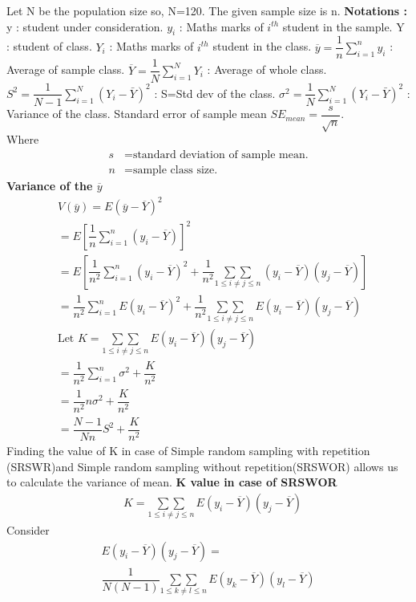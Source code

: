 Let N be the population size so, N=120. The given sample size is n.
\textbf{Notations :}
y : student under consideration.
$y_i$ : Maths marks of $i^{th}$ student in the sample.
Y : student of class.
$Y_i$ : Maths marks of $i^{th}$ student in the class.
$\overline{y}=\dfrac{1}{n}\sum_{i=1}^{n}y_i$ : Average of sample class.
$\overline{Y}=\dfrac{1}{N}\sum_{i=1}^{N}Y_i$ : Average of whole class.
$S^2 = \dfrac{1}{N-1} \sum_{i=1}^{N} (Y_i-\bar{Y})^2$ : S=Std dev of the class.
$\sigma^2=\dfrac{1}{N} \sum_{i=1}^{N} (Y_i-\bar{Y})^2$ : Variance of the class.
Standard error of sample mean $SE_{mean}=\dfrac{s}{\sqrt{n}}$.\\
Where 
\begin{align*}
s & = \text{standard deviation of sample mean.}\\
n & = \text{sample class size.}
\end{align*}
\textbf{Variance of the $\overline{y}$}
\begin{align}
& V(\overline{y})= E(\overline{y}-\overline{Y})^2\\
& = E\left[\dfrac{1}{n} \sum_{i=1}^{n}(y_i-\overline{Y})\right]^2\\
& = E\left[\dfrac{1}{n^2} \sum_{i=1}^{n} (y_i-\overline{Y})^2 + \dfrac{1}{n^2} \underset{1\leq i\neq j\leq n}{\sum\sum}\, (y_i-\overline{Y})(y_j-\overline{Y})\right]\\
& = \dfrac{1}{n^2}\sum_{i=1}^{n} E(y_i-\overline{Y})^2+\dfrac{1}{n^2} \underset{1\leq i\neq j\leq n}{\sum\sum}\, E(y_i-\overline{Y})(y_j-\overline{Y})\\
& \text{Let } K=\underset{1\leq i\neq j\leq n}{\sum\sum}\, E(y_i-\overline{Y})(y_j-\overline{Y})\\
& = \dfrac{1}{n^2}\sum_{i=1}^{n} \sigma^2 + \dfrac{K}{n^2}\\
& = \dfrac{1}{n^2} n \sigma^2 +\dfrac{K}{n^2}\\
& = \dfrac{N-1}{Nn} S^2+\dfrac{K}{n^2}\label{june2018-58:eq_1}
\end{align}
Finding the value of K in case of Simple random sampling with repetition (SRSWR)and Simple random sampling without repetition(SRSWOR) allows us to calculate the variance of mean.
\vspace{0.5 cm}
\textbf{K value in case of SRSWOR}
\begin{align*}
&K=\underset{1\leq i\neq j\leq n}{\sum\sum}\, E(y_i-\overline{Y})(y_j-\overline{Y})
\end{align*}
Consider
\begin{multline*}
E(y_i-\overline{Y})(y_j-\overline{Y})= \\
\dfrac{1}{N(N-1)}\underset{1\leq k\neq l\leq n}{\sum\sum}\, E(y_k-\overline{Y})(y_l-\overline{Y})
\end{multline*}
